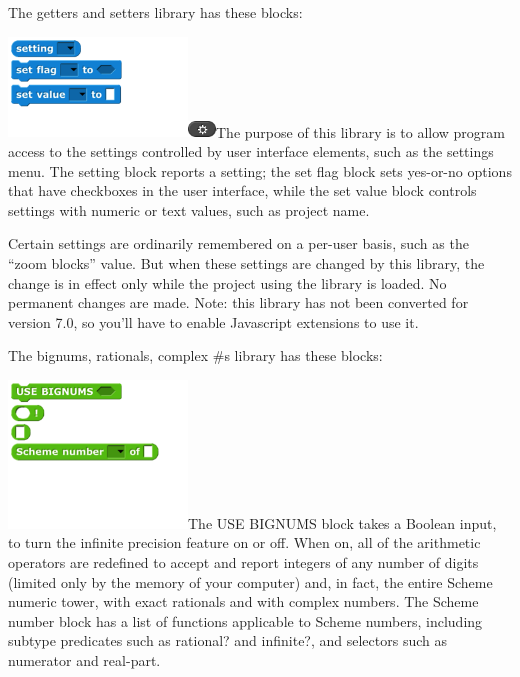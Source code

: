 The getters and setters library has these blocks:

\includegraphics[width=1.875in,height=1.05in]{media/image452.png}\includegraphics[width=0.29167in,height=0.16667in]{media/image453.png}The
purpose of this library is to allow program access to the settings
controlled by user interface elements, such as the settings menu. The
setting block reports a setting; the set flag block sets yes-or-no
options that have checkboxes in the user interface, while the set value
block controls settings with numeric or text values, such as project
name.

Certain settings are ordinarily remembered on a per-user basis, such as
the ``zoom blocks'' value. But when these settings are changed by this
library, the change is in effect only while the project using the
library is loaded. No permanent changes are made. Note: this library has
not been converted for version 7.0, so you'll have to enable Javascript
extensions to use it.

The bignums, rationals, complex \#s library has these blocks:

\includegraphics[width=1.875in,height=1.55in]{media/image454.png}The USE
BIGNUMS block takes a Boolean input, to turn the infinite precision
feature on or off. When on, all of the arithmetic operators are
redefined to accept and report integers of any number of digits (limited
only by the memory of your computer) and, in fact, the entire Scheme
numeric tower, with exact rationals and with complex numbers. The Scheme
number block has a list of functions applicable to Scheme numbers,
including subtype predicates such as rational? and infinite?, and
selectors such as numerator and real-part.

